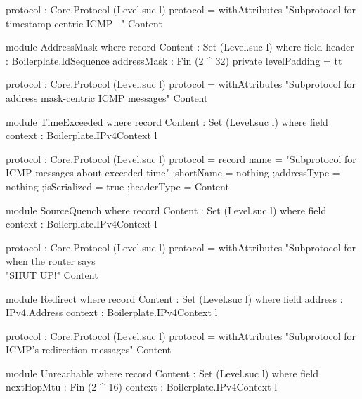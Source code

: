 \documentclass{report}
\begin{document}
\begin{itemize}
\begin{code}
      protocol : Core.Protocol (Level.suc l)
      protocol = withAttributes "Subprotocol for timestamp-centric ICMP \
                                \messages"
                                Content
\end{code}

\begin{code}
    module AddressMask where
      record Content : Set (Level.suc l) where
        field
          header : Boilerplate.IdSequence
          addressMask : Fin (2 ^ 32)
        private
          levelPadding = tt

      protocol : Core.Protocol (Level.suc l)
      protocol = withAttributes "Subprotocol for address mask-centric ICMP messages"
                                Content
\end{code}

\begin{code}
    module TimeExceeded where
      record Content : Set (Level.suc l) where
        field
          context : Boilerplate.IPv4Context l

      protocol : Core.Protocol (Level.suc l)
      protocol = record
        {name = "Subprotocol for ICMP messages about exceeded time"
        ;shortName = nothing
        ;addressType = nothing
        ;isSerialized = true
        ;headerType = Content
        }
\end{code}

\begin{code}
    module SourceQuench where
      record Content : Set (Level.suc l) where
        field
          context : Boilerplate.IPv4Context l

      protocol : Core.Protocol (Level.suc l)
      protocol = withAttributes "Subprotocol for when the router says \
                                \\"SHUT UP!\""
                                Content
\end{code}

\begin{code}
    module Redirect where
      record Content : Set (Level.suc l) where
        field
          address : IPv4.Address
          context : Boilerplate.IPv4Context l

      protocol : Core.Protocol (Level.suc l)
      protocol = withAttributes "Subprotocol for ICMP's redirection messages"
                                Content
\end{code}

\begin{code}
    module Unreachable where
      record Content : Set (Level.suc l) where
        field
          nextHopMtu : Fin (2 ^ 16)
          context : Boilerplate.IPv4Context l


\end{code}
\end{itemize}
\end{document}
